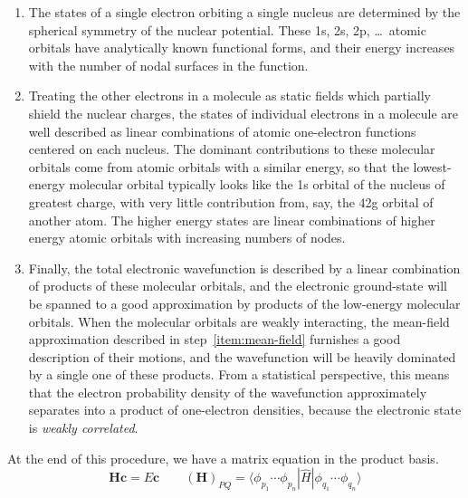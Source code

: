 \begin{enumerate}
    \item
        \label{item:atomic-orbitals}
        The states of a single electron orbiting a single nucleus are determined
        by the spherical symmetry of the nuclear potential.
        These 1s, 2s, 2p, \dots\ atomic orbitals have analytically known
        functional forms, and their energy increases with the number of nodal
        surfaces in the function.
    \item
        \label{item:mean-field}
        Treating the other electrons in a molecule as static fields which
        partially shield the nuclear charges, the states of individual electrons
        in a molecule are well described as linear combinations of atomic
        one-electron functions centered on each nucleus.
        The dominant contributions to these molecular orbitals come from atomic
        orbitals with a similar energy, so that the lowest-energy molecular
        orbital typically looks like the 1s orbital of the nucleus of greatest
        charge, with very little contribution from, say, the 42g orbital of
        another atom.
        The higher energy states are linear combinations of higher energy atomic
        orbitals with increasing numbers of nodes.
    \item
        \label{item:full-ci}
        Finally, the total electronic wavefunction is described by a linear
        combination of products of these molecular orbitals, and the electronic
        ground-state will be spanned to a good approximation by products of the
        low-energy molecular orbitals.
        When the molecular orbitals are weakly interacting, the mean-field
        approximation described in step~\ref{item:mean-field} furnishes a good
        description of their motions, and the wavefunction will be heavily
        dominated by a single one of these products.
        From a statistical perspective, this means that the electron probability
        density of the wavefunction approximately separates into a product of
        one-electron densities, because the electronic state is {\itshape weakly
        correlated}.
\end{enumerate}
At the end of this procedure, we have a matrix equation in the product basis.
\begin{equation}
    \mathbf{H}\mathbf{c}
    =
    E\mathbf{c}
    \qquad
    (\mathbf{H})_{PQ}
    =
    \langle \phi_{p_1}\cdots \phi_{p_n}|
    \hat{H}
    |\phi_{q_1}\cdots \phi_{q_n} \rangle
\end{equation}
